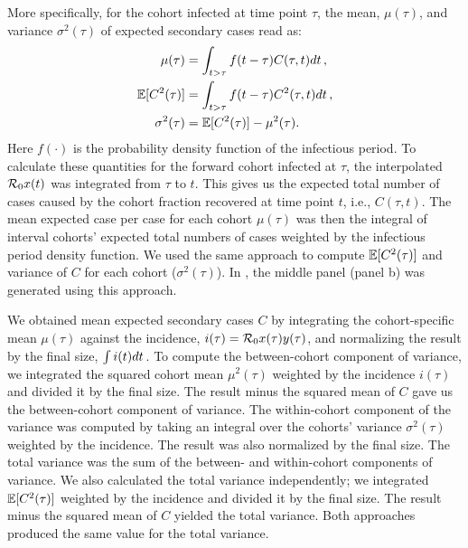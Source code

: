 More specifically, for the cohort infected at time point $\tau$, the
mean, $\mu(\tau)$, and variance $\sigma^2(\tau)$ of expected secondary cases read as:
\begin{subequations} \label{eq_statistics}
	\begin{align}
 		\mu(\tau) &=  \int_{t>\tau} f(t-\tau)  C(\tau, t) dt\,, \\
 		\mathbb{E}[C^2(\tau)] &= \int_{t>\tau} f(t-\tau)  C^2(\tau, t)dt\,,\\
  		\sigma^2(\tau) &=  \mathbb{E}[C^2(\tau)] - \mu^2(\tau).
  	\end{align}
\end{subequations}
Here $f(\cdot)$ is the probability density function of the infectious period.
To calculate these quantities for the forward cohort infected at $\tau$, the interpolated ${\mathcal R}_{\mathrm{0}} x(t)$ was integrated from $\tau$ to $t$.
This gives us  the expected total number of cases caused by the cohort fraction recovered at time point $t$, i.e., $C(\tau,t)$.
The mean expected case per case for each cohort $\mu(\tau)$ was then the integral of interval cohorts' expected total numbers of cases  weighted by the infectious period density function.
We used the same approach to compute $\mathbb{E}[C^2(\tau)]$ and  variance of $C$ for each cohort ($\sigma^2(\tau)$).
In , the middle panel (panel b) was generated using this approach.

We obtained  mean expected secondary cases $C$ by integrating the cohort-specific mean $\mu(\tau)$ against the incidence, $i(\tau) = {\mathcal R}_{\mathrm{0}} x(\tau)y(\tau)$, and normalizing the result by the final size, $\int i(t) dt\,$.
To compute the between-cohort component of variance, we integrated the squared cohort mean $\mu^2(\tau)$ weighted by the incidence $i(\tau)$ and divided it  by the final size.
The result minus the squared mean of $C$ gave us the between-cohort component of variance.
The within-cohort component of the variance  was computed by taking an integral over the cohorts' variance $\sigma^2(\tau)$ weighted by the incidence.
The result was also normalized by the final size.
The total variance was the sum of the between- and within-cohort components of variance. 
We also calculated the total variance independently; 
  we integrated $\mathbb{E}[C^2(\tau)]$ weighted by the incidence and divided it by the final size. 
 The result minus the squared mean of  $C$ yielded the total variance.
Both approaches produced the same value for the total variance.


